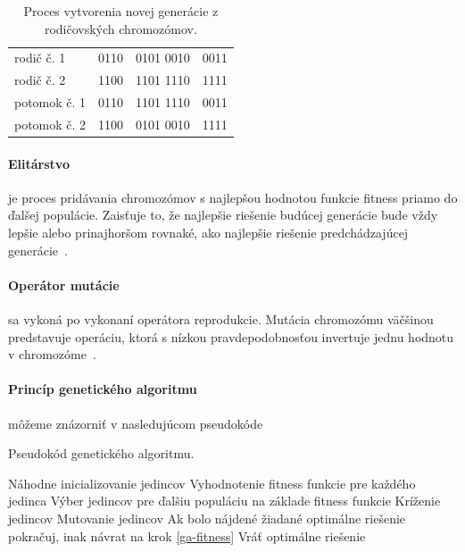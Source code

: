 \documentclass[a4paper,slovak,12pt,appendix]{article}
\begin{document}
\begin{table}[H]
  \centering
  \caption[Proces vytvorenia novej generácie.]{Proces vytvorenia novej generácie z rodičovských chromozómov.}
  \label{tab-crossing}
  \begin{tabular}{p{4cm}l|l|l}
    rodič č. 1      &  0110 & 0101  0010 & 0011  \\
    rodič č. 2      &  1100 & 1101  1110 & 1111  \\
    \hline
    potomok č. 1    &  0110 & 1101  1110 & 0011  \\
    potomok č. 2    &  1100 & 0101  0010 & 1111  \\
  \end{tabular}
\end{table}

\paragraph{Elitárstvo} je proces pridávania chromozómov s najlepšou hodnotou
funkcie fitness priamo do ďalšej populácie. Zaisťuje to, že najlepšie riešenie
budúcej generácie bude vždy lepšie alebo prinajhoršom rovnaké, ako najlepšie
riešenie predchádzajúcej generácie~\cite{Deolekar2016}.

\paragraph{Operátor mutácie} sa vykoná po vykonaní operátora reprodukcie.
Mutácia chromozómu väčšinou predstavuje operáciu, ktorá s nízkou
pravdepodobnosťou invertuje jednu hodnotu v chromozóme~\cite{Chavan2015}.

\paragraph{Princíp genetického algoritmu} môžeme znázorniť v nasledujúcom
pseudokóde~\cite{Chavan2015}
\begin{algorithm}
  \caption{Pseudokód genetického algoritmu.}
  \begin{algorithmic}[1]
    \State Náhodne inicializovanie jedincov
    \State Vyhodnotenie fitness funkcie pre každého jedinca \label{ga-fitness}
    \State Výber jedincov pre ďalšiu populáciu na základe fitness funkcie
    \State Kríženie jedincov
    \State Mutovanie jedincov
    \State Ak bolo nájdené žiadané optimálne riešenie pokračuj, inak návrat na krok \ref{ga-fitness}
    \State Vráť optimálne riešenie
  \end{algorithmic}
\end{algorithm}
\end{document}
